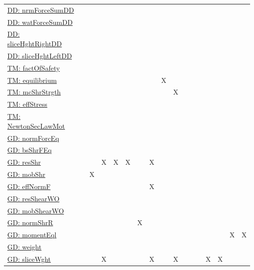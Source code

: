 \documentclass[12pt]{article}
\begin{document}
\begin{longtable}{l l l l l l l l l l l l l l l l l}
\\
\hyperref[DD:nrmForceSumDD]{DD: nrmForceSumDD} &  &  &  &  &  &  &  &  &  &  &  &  &  &  &  & 
\\
\hyperref[DD:watForceSumDD]{DD: watForceSumDD} &  &  &  &  &  &  &  &  &  &  &  &  &  &  &  & 
\\
\hyperref[DD:sliceHghtRightDD]{DD: sliceHghtRightDD} &  &  &  &  &  &  &  &  &  &  &  &  &  &  &  & 
\\
\hyperref[DD:sliceHghtLeftDD]{DD: sliceHghtLeftDD} &  &  &  &  &  &  &  &  &  &  &  &  &  &  &  & 
\\
\hyperref[TM:factOfSafety]{TM: factOfSafety} &  &  &  &  &  &  &  &  &  &  &  &  &  &  &  & 
\\
\hyperref[TM:equilibrium]{TM: equilibrium} &  &  &  &  &  &  &  & X &  &  &  &  &  &  &  & 
\\
\hyperref[TM:mcShrStrgth]{TM: mcShrStrgth} &  &  &  &  &  &  &  &  & X &  &  &  &  &  &  & 
\\
\hyperref[TM:effStress]{TM: effStress} &  &  &  &  &  &  &  &  &  &  &  &  &  &  &  & 
\\
\hyperref[TM:NewtonSecLawMot]{TM: NewtonSecLawMot} &  &  &  &  &  &  &  &  &  &  &  &  &  &  &  & 
\\
\hyperref[GD:normForcEq]{GD: normForcEq} &  &  &  &  &  &  &  &  &  &  &  &  &  &  &  & 
\\
\hyperref[GD:bsShrFEq]{GD: bsShrFEq} &  &  &  &  &  &  &  &  &  &  &  &  &  &  &  & 
\\
\hyperref[GD:resShr]{GD: resShr} &  &  & X & X & X &  & X &  &  &  &  &  &  &  &  & 
\\
\hyperref[GD:mobShr]{GD: mobShr} &  & X &  &  &  &  &  &  &  &  &  &  &  &  &  & 
\\
\hyperref[GD:effNormF]{GD: effNormF} &  &  &  &  &  &  & X &  &  &  &  &  &  &  &  & 
\\
\hyperref[GD:resShearWO]{GD: resShearWO} &  &  &  &  &  &  &  &  &  &  &  &  &  &  &  & 
\\
\hyperref[GD:mobShearWO]{GD: mobShearWO} &  &  &  &  &  &  &  &  &  &  &  &  &  &  &  & 
\\
\hyperref[GD:normShrR]{GD: normShrR} &  &  &  &  &  & X &  &  &  &  &  &  &  &  &  & 
\\
\hyperref[GD:momentEql]{GD: momentEql} &  &  &  &  &  &  &  &  &  &  &  &  &  &  & X & X
\\
\hyperref[GD:weight]{GD: weight} &  &  &  &  &  &  &  &  &  &  &  &  &  &  &  & 
\\
\hyperref[GD:sliceWght]{GD: sliceWght} &  &  & X &  &  &  & X &  & X &  &  &  & X & X &  & 

\end{longtable}
\end{document}
